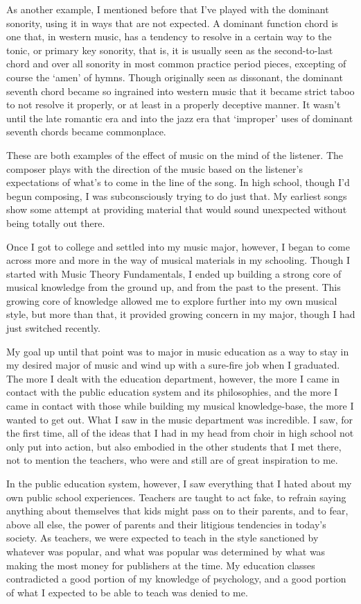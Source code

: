\documentclass{book}
\begin{document}
As another example, I mentioned before that I've played with the dominant sonority, using it in ways that are not expected.  A dominant function chord is one that, in western music, has a tendency to resolve in a certain way to the tonic, or primary key sonority, that is, it is usually seen as the second-to-last chord and over all sonority in most common practice period pieces, excepting of course the `amen' of hymns.  Though originally seen as dissonant, the dominant seventh chord became so ingrained into western music that it became strict taboo to not resolve it properly, or at least in a properly deceptive manner.  It wasn't until the late romantic era and into the jazz era that `improper' uses of dominant seventh chords became commonplace.

These are both examples of the effect of music on the mind of the listener.  The composer plays with the direction of the music based on the listener's expectations of what's to come in the line of the song.  In high school, though I'd begun composing, I was subconsciously trying to do just that.  My earliest songs show some attempt at providing material that would sound unexpected without being totally out there.

Once I got to college and settled into my music major, however, I began to come across more and more in the way of musical materials in my schooling.  Though I started with Music Theory Fundamentals, I ended up building a strong core of musical knowledge from the ground up, and from the past to the present.  This growing core of knowledge allowed me to explore further into my own musical style, but more than that, it provided growing concern in my major, though I had just switched recently.

My goal up until that point was to major in music education as a way to stay in my desired major of music and wind up with a sure-fire job when I graduated.  The more I dealt with the education department, however, the more I came in contact with the public education system and its philosophies, and the more I came in contact with those while building my musical knowledge-base, the more I wanted to get out.  What I saw in the music department was incredible.  I saw, for the first time, all of the ideas that I had in my head from choir in high school not only put into action, but also embodied in the other students that I met there, not to mention the teachers, who were and still are of great inspiration to me.

In the public education system, however, I saw everything that I hated about my own public school experiences.  Teachers are taught to act fake, to refrain saying anything about themselves that kids might pass on to their parents, and to fear, above all else, the power of parents and their litigious tendencies in today's society.  As teachers, we were expected to teach in the style sanctioned by whatever was popular, and what was popular was determined by what was making the most money for publishers at the time.  My education classes contradicted a good portion of my knowledge of psychology, and a good portion of what I expected to be able to teach was denied to me.
\end{document}
